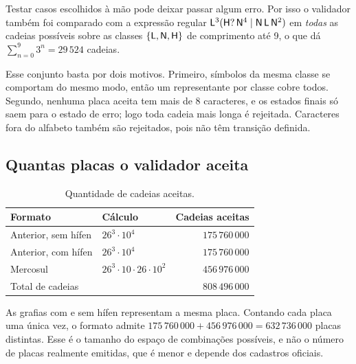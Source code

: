 Testar casos escolhidos à mão pode deixar passar algum erro. Por
isso o validador também foi comparado com a expressão regular
$\mathsf{L}^3(\mathsf{H}?\,\mathsf{N}^4 \mid \mathsf{N}\,\mathsf{L}\,\mathsf{N}^2)$ em \emph{todas} as
cadeias possíveis sobre as classes $\{\mathsf{L}, \mathsf{N}, \mathsf{H}\}$ de
comprimento até 9, o que dá
$\sum_{n=0}^{9} 3^n = 29\,524$ cadeias.

Esse conjunto basta por dois motivos. Primeiro, símbolos da mesma
classe se comportam do mesmo modo, então um representante por
classe cobre todos. Segundo, nenhuma placa aceita tem mais de 8
caracteres, e os estados finais só saem para o estado de erro;
logo toda cadeia mais longa é rejeitada. Caracteres fora do
alfabeto também são rejeitados, pois não têm transição definida.

\subsection{Quantas placas o validador aceita}

\begin{table}[ht]
\centering
\renewcommand{\arraystretch}{1.2}
\begin{tabular}{llr}
\toprule
Formato & Cálculo & Cadeias aceitas \\
\midrule
Anterior, sem hífen & $26^3 \cdot 10^4$ & $175\,760\,000$ \\
Anterior, com hífen & $26^3 \cdot 10^4$ & $175\,760\,000$ \\
Mercosul & $26^3 \cdot 10 \cdot 26 \cdot 10^2$ & $456\,976\,000$ \\
\midrule
Total de cadeias & & $808\,496\,000$ \\
\bottomrule
\end{tabular}
\caption{Quantidade de cadeias aceitas.}
\label{tab:contagem}
\end{table}

As grafias com e sem hífen representam a mesma placa. Contando cada
placa uma única vez, o formato admite
$175\,760\,000 + 456\,976\,000 = 632\,736\,000$ placas distintas.
Esse é o tamanho do espaço de combinações possíveis, e não o número
de placas realmente emitidas, que é menor e depende dos cadastros
oficiais.